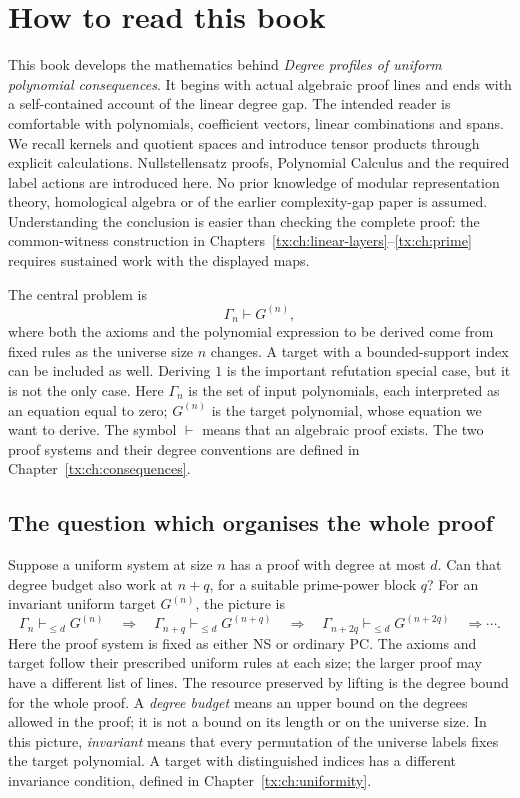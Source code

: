 \chapter*{How to read this book}
This book develops the mathematics behind \emph{Degree profiles of
uniform polynomial consequences}. It begins with actual algebraic proof
lines and ends with a self-contained account of the linear degree gap.
The intended reader is comfortable with polynomials, coefficient
vectors, linear combinations and spans. We recall kernels and quotient
spaces and introduce tensor products through explicit calculations.
Nullstellensatz proofs, Polynomial Calculus and the required label
actions are introduced here. No prior knowledge of modular
representation theory, homological algebra or of the earlier
complexity-gap paper is assumed. Understanding the conclusion is easier
than checking the complete proof: the common-witness construction in
Chapters~\ref{tx:ch:linear-layers}--\ref{tx:ch:prime} requires sustained
work with the displayed maps.

The central problem is
\[
                    \Gamma_n\vdash G^{(n)},
\]
where both the axioms and the polynomial expression to be derived come
from fixed rules as the universe size $n$ changes. A target with a
bounded-support index can be included as well. Deriving $1$ is the
important refutation special case, but it is not the only case.
Here $\Gamma_n$ is the set of input polynomials, each interpreted as
an equation equal to zero; $G^{(n)}$ is the target polynomial, whose equation
we want to derive. The symbol $\vdash$ means that an algebraic proof
exists. The two proof systems and their degree conventions are defined
in Chapter~\ref{tx:ch:consequences}.

\section*{The question which organises the whole proof}
Suppose a uniform system at size $n$ has a proof with degree at most
$d$. Can that degree budget also work at $n+q$, for a suitable
prime-power block $q$? For an invariant uniform target $G^{(n)}$, the
picture is
\[
 \Gamma_n\vdash_{\le d}G^{(n)}
 \quad\Longrightarrow\quad
 \Gamma_{n+q}\vdash_{\le d}G^{(n+q)}
 \quad\Longrightarrow\quad
 \Gamma_{n+2q}\vdash_{\le d}G^{(n+2q)}\quad\Longrightarrow\cdots.
\]
Here the proof system is fixed as either NS or ordinary PC. The
axioms and target follow their prescribed uniform rules at each size;
the larger proof may have a different list of lines. The resource
preserved by lifting is the degree bound for the whole proof. A
\emph{degree budget} means an upper bound on the degrees allowed in
the proof; it is not a bound on its length or on the universe size.
In this picture, \emph{invariant} means that every permutation of the
universe labels fixes the target polynomial. A target with distinguished
indices has a different invariance condition, defined in
Chapter~\ref{tx:ch:uniformity}.

